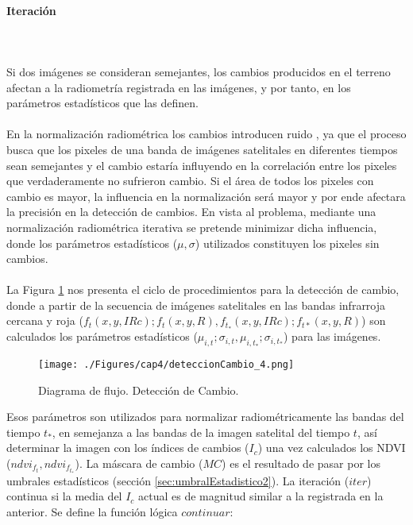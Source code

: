 \paragraph{Iteraci\'on}\label{subsec:iteracion}\mbox{}\\\mbox{}\\
 Si dos im\'agenes se consideran semejantes, los cambios producidos en el terreno afectan a la radiometr\'ia registrada en las im\'agenes, y por tanto, en los par\'ametros estad\'isticos que las definen.\\~\\
En la normalizaci\'on radiom\'etrica los cambios introducen ruido \cite{martinez2013normalizacion}, ya que el proceso busca que los pixeles de una banda de im\'agenes satelitales en diferentes tiempos sean semejantes y el cambio estar\'ia influyendo en la correlaci\'on entre los pixeles que verdaderamente no sufrieron cambio. Si el \'area de todos los pixeles con cambio es mayor, la influencia en la normalizaci\'on ser\'a mayor y por ende afectara la precisi\'on en la detecci\'on de cambios. En vista al problema, mediante una normalizaci\'on radiom\'etrica iterativa se pretende minimizar dicha influencia, donde los par\'ametros estad\'isticos ($ \mu,\sigma $) utilizados constituyen los pixeles sin cambios.\\~\\	
La Figura \ref{fig:deteccionCambio} nos presenta el ciclo de procedimientos para la detecci\'on de cambio, donde a partir de la secuencia de im\'agenes satelitales en las bandas infrarroja cercana y roja ($ f_{t}(x,y,IRc);f_{t}(x,y,R), f_{t_{*}}(x,y,IRc);f_{t*}(x,y,R) $) son calculados los par\'ametros estad\'isticos ($ \mu_{i,t};\sigma_{i,t}, \mu_{i,t_{*}};\sigma_{i,t_{*}} $) para las im\'agenes.
\begin{figure}[H]
	\centering
	\texttt{[image: ./Figures/cap4/deteccionCambio\_4.png]}
	\caption{Diagrama de flujo. Detecci\'on de Cambio.}
	\label{fig:deteccionCambio}
\end{figure}
 Esos par\'ametros son utilizados para normalizar radiom\'etricamente las bandas del tiempo $ t_{*} $, en semejanza a las bandas de la imagen satelital del tiempo $ t $, as\'i determinar la imagen con los \'indices de cambios ($ I_{c} $) una vez calculados los NDVI ($ ndvi_{f_{t}},ndvi_{f_{t_{*}}} $). La m\'ascara de cambio ($ MC $) es el resultado de pasar por los umbrales estad\'isticos (secci\'on \ref{sec:umbralEstadistico2}). La iteraci\'on ($ iter $) continua si la media del $ I_{c} $ actual es de magnitud similar a la registrada en la anterior. Se define la funci\'on l\'ogica $ continuar $:
